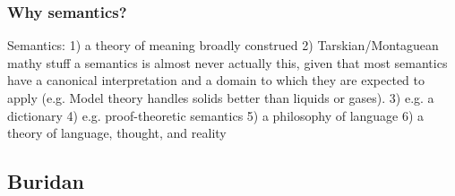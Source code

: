 \documentclass[]{article}
\begin{document}

%
\subsubsection{Why semantics?}
Semantics: 
1) a theory of meaning broadly construed
2) Tarskian/Montaguean mathy stuff
	a semantics is almost never actually this, given that most semantics have a canonical interpretation and a domain to which they are expected to apply (e.g. Model theory handles solids better than liquids or gases).
3) e.g. a dictionary
4) e.g. proof-theoretic semantics
5) a philosophy of language
6) a theory of language, thought, and reality



\subsection{Buridan}

\end{document}
